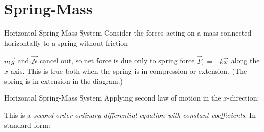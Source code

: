 \documentclass[12pt,compress,aspectratio=169]{beamer}
\begin{document}
\section{Spring-Mass}

\begin{frame}{Horizontal Spring-Mass System}
  Consider the forces acting on a mass connected horizontally to a spring
  without friction
  \begin{center}
  \end{center}
  $m\vec g$ and $\vec N$ cancel out, so net force is due only to spring force
  $\vec F_s=-k\vec x$ along the $x$-axis. This is true both when the spring is
  in compression or extension. (The spring is in extension in the diagram.)
\end{frame}



\begin{frame}{Horizontal Spring-Mass System}
  Applying second law of motion in the $x$-direction:


  This is a
  \emph{second-order ordinary differential equation with constant
    coefficients}. In standard form:

  

\end{frame}
\end{document}
